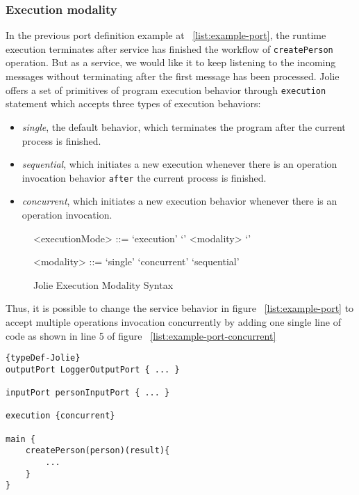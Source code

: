 \subsubsection{Execution modality}

In the previous port definition example at ~\ref{list:example-port}, the runtime execution terminates after service has finished the workflow of \texttt{createPerson} operation. But as a service, we would like it to keep listening to the incoming messages without terminating after the first message has been processed.
Jolie offers a set of primitives of program execution behavior through \texttt{execution} statement which accepts three types of execution behaviors:

\begin{itemize}
    \item \textit{single}, the default behavior, which terminates the program after the current process is finished.
    \item \textit{sequential}, which initiates a new execution whenever there is an operation invocation behavior \texttt{after} the current process is finished.
    \item \textit{concurrent}, which initiates a new execution behavior whenever there is an operation invocation.
\end{itemize}

\begin{figure}[ht]
    \begin{framed}
        \begin{grammar}
            <executionMode>
            ::= `execution' `{' <modality> `}'

            <modality>
            ::= `single'
            \alt `concurrent'
            \alt `sequential'
        \end{grammar}
    \end{framed}
    \caption{Jolie Execution Modality Syntax}
\end{figure}

Thus, it is possible to change the service behavior in figure ~\ref{list:example-port} to accept multiple operations invocation concurrently by adding one single line of code as shown in line 5 of figure ~\ref{list:example-port-concurrent}

\begin{listing}[ht]

    \lstset{language=Jolie,
        style=codeStyle,
        numbers=left,
        firstnumber=1
    }
    \begin{lstlisting}[frame=tlrb, caption= {Jolie concurrent service example}, label={list:example-port-concurrent} ]{typeDef-Jolie}
outputPort LoggerOutputPort { ... }

inputPort personInputPort { ... }

execution {concurrent}

main {
    createPerson(person)(result){
        ...
    }
}
\end{lstlisting}
\end{listing}

\FloatBarrier